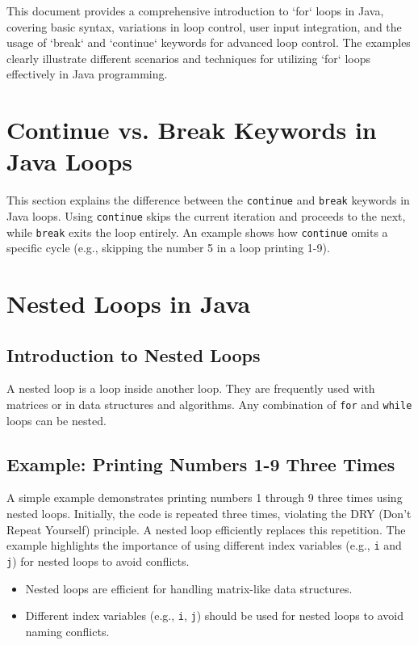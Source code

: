 \documentclass{article}
\begin{document}
This document provides a comprehensive introduction to `for` loops in Java, covering basic syntax, variations in loop control, user input integration, and the usage of `break` and `continue` keywords for advanced loop control.  The examples clearly illustrate different scenarios and techniques for utilizing `for` loops effectively in Java programming.


\section{Continue vs. Break Keywords in Java Loops}

This section explains the difference between the \texttt{continue} and \texttt{break} keywords in Java loops.  Using \texttt{continue} skips the current iteration and proceeds to the next, while \texttt{break} exits the loop entirely.  An example shows how \texttt{continue} omits a specific cycle (e.g., skipping the number 5 in a loop printing 1-9).


\section{Nested Loops in Java}

\subsection{Introduction to Nested Loops}

A nested loop is a loop inside another loop.  They are frequently used with matrices or in data structures and algorithms.  Any combination of \texttt{for} and \texttt{while} loops can be nested.

\subsection{Example: Printing Numbers 1-9 Three Times}

A simple example demonstrates printing numbers 1 through 9 three times using nested loops.  Initially, the code is repeated three times, violating the DRY (Don't Repeat Yourself) principle.  A nested loop efficiently replaces this repetition.  The example highlights the importance of using different index variables (e.g., \texttt{i} and \texttt{j}) for nested loops to avoid conflicts.

\begin{itemize}
    \item Nested loops are efficient for handling matrix-like data structures.
    \item Different index variables (e.g., \texttt{i}, \texttt{j}) should be used for nested loops to avoid naming conflicts.
\end{itemize}
\end{document}
